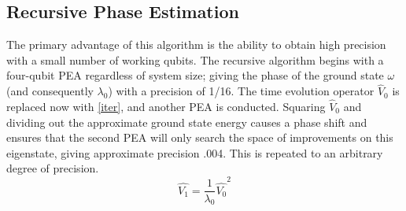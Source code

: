 \documentclass{article}
\begin{document}
\subsection{Recursive Phase Estimation \cite{alan}}
\begin{paragraph}{}
The primary advantage of this algorithm is the ability to obtain high precision with a small number of working qubits.  The recursive algorithm begins with a four-qubit PEA regardless of system size; giving the phase of the ground state $\omega$ (and consequently $\lambda_0$) with a precision of 1/16.  The time evolution operator $\hat{V}_0$ is replaced now with \ref{iter}, and another PEA is conducted.  Squaring $\hat{V}_0$ and dividing out the approximate ground state energy causes a phase shift and ensures that the second PEA will only search the space of improvements on this eigenstate, giving approximate precision .004.  This is repeated to an arbitrary degree of precision.
\begin{equation}\label{iter}
\hat{V_1}={\frac{1}{\lambda_0}\hat{V_0}}^2
\end{equation}
\end{paragraph}
\end{document}
